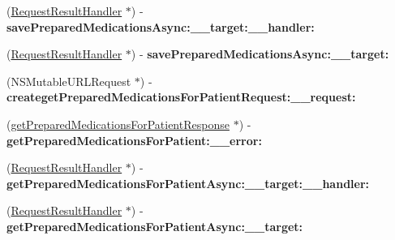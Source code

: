 \begin{DoxyCompactItemize}
\item 
\hypertarget{interface_supply_chain_service_port_binding_ad5018ac4930f8841fc10936d80f4d9b5}{}(\hyperlink{interface_request_result_handler}{Request\+Result\+Handler} $\ast$) -\/ {\bfseries save\+Prepared\+Medications\+Async\+:\+\_\+\+\_\+target\+:\+\_\+\+\_\+handler\+:}\label{interface_supply_chain_service_port_binding_ad5018ac4930f8841fc10936d80f4d9b5}

\item 
\hypertarget{interface_supply_chain_service_port_binding_a58e7d329c34d15b3de90fdbab49a8c5c}{}(\hyperlink{interface_request_result_handler}{Request\+Result\+Handler} $\ast$) -\/ {\bfseries save\+Prepared\+Medications\+Async\+:\+\_\+\+\_\+target\+:}\label{interface_supply_chain_service_port_binding_a58e7d329c34d15b3de90fdbab49a8c5c}

\item 
\hypertarget{interface_supply_chain_service_port_binding_ae736b133a68c29b18ec5cb64744bb30c}{}(N\+S\+Mutable\+U\+R\+L\+Request $\ast$) -\/ {\bfseries createget\+Prepared\+Medications\+For\+Patient\+Request\+:\+\_\+\+\_\+request\+:}\label{interface_supply_chain_service_port_binding_ae736b133a68c29b18ec5cb64744bb30c}

\item 
\hypertarget{interface_supply_chain_service_port_binding_aa85b1c75573ff7a9cd0c46109b35e2f9}{}(\hyperlink{interfaceget_prepared_medications_for_patient_response}{get\+Prepared\+Medications\+For\+Patient\+Response} $\ast$) -\/ {\bfseries get\+Prepared\+Medications\+For\+Patient\+:\+\_\+\+\_\+error\+:}\label{interface_supply_chain_service_port_binding_aa85b1c75573ff7a9cd0c46109b35e2f9}

\item 
\hypertarget{interface_supply_chain_service_port_binding_a5279db6d7b3ccca7b87b9869e66ba9f2}{}(\hyperlink{interface_request_result_handler}{Request\+Result\+Handler} $\ast$) -\/ {\bfseries get\+Prepared\+Medications\+For\+Patient\+Async\+:\+\_\+\+\_\+target\+:\+\_\+\+\_\+handler\+:}\label{interface_supply_chain_service_port_binding_a5279db6d7b3ccca7b87b9869e66ba9f2}

\item 
\hypertarget{interface_supply_chain_service_port_binding_ab9a0dea986c3fffb2814996ed063ab5d}{}(\hyperlink{interface_request_result_handler}{Request\+Result\+Handler} $\ast$) -\/ {\bfseries get\+Prepared\+Medications\+For\+Patient\+Async\+:\+\_\+\+\_\+target\+:}\label{interface_supply_chain_service_port_binding_ab9a0dea986c3fffb2814996ed063ab5d}


\end{DoxyCompactItemize}
